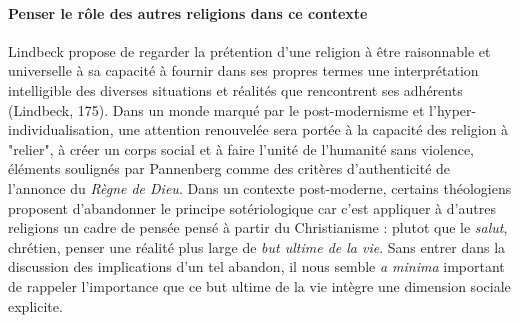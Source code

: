 \paragraph{Penser le rôle des autres religions dans ce contexte}
Lindbeck propose de regarder la prétention d'une religion à être raisonnable et universelle à sa capacité à fournir dans ses propres termes une interprétation intelligible des diverses situations et réalités que rencontrent ses adhérents (Lindbeck, 175). Dans un monde marqué par le post-modernisme et l'hyper-individualisation, une attention renouvelée sera portée à la capacité des religion à "relier", à créer un corps social et à faire l'unité de l'humanité sans violence, éléments soulignés par Pannenberg comme des critères d'authenticité de l'annonce du \textit{Règne de Dieu}. 
Dans un contexte post-moderne, certains théologiens  proposent d'abandonner le principe sotériologique car c'est appliquer à d'autres religions un cadre de pensée pensé à partir du Christianisme : plutot que le \textit{salut}, chrétien, penser une réalité plus large de \textit{but ultime de la vie}.  Sans entrer dans la discussion des implications d'un tel abandon, il nous semble \textit{a minima} important de rappeler l'importance que ce but ultime de la vie intègre une dimension sociale explicite. 



